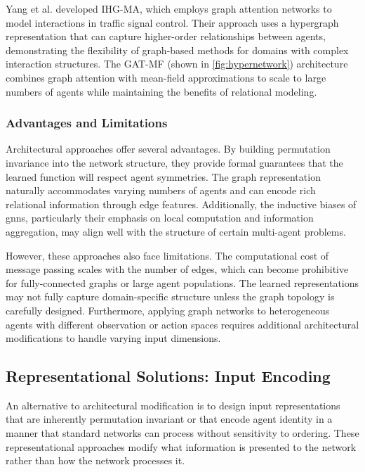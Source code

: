 Yang et al. \cite{yang2021a} developed IHG-MA, which employs
graph attention networks to model interactions in traffic signal
control. Their approach uses a hypergraph representation that
can capture higher-order relationships between agents,
demonstrating the flexibility of graph-based methods for
domains with complex interaction structures. The GAT-MF (shown in \cref{fig:hypernetwork})
architecture \cite{hao2023} combines graph attention with
mean-field approximations to scale to large numbers of agents
while maintaining the benefits of relational modeling.

\subsubsection{Advantages and Limitations}

Architectural approaches offer several advantages. By building
permutation invariance into the network structure, they provide
formal guarantees that the learned function will respect agent
symmetries. The graph representation naturally accommodates
varying numbers of agents and can encode rich relational
information through edge features. Additionally, the inductive
biases of \glspl{gnn}, particularly their emphasis on local
computation and information aggregation, may align well with
the structure of certain multi-agent problems.

However, these approaches also face limitations. The
computational cost of message passing scales with the number
of edges, which can become prohibitive for fully-connected
graphs or large agent populations. The learned representations
may not fully capture domain-specific structure unless the
graph topology is carefully designed. Furthermore, applying
graph networks to heterogeneous agents with different
observation or action spaces requires additional architectural
modifications to handle varying input dimensions.

\subsection{Representational Solutions: Input Encoding}
\label{sec:input-encoding}

An alternative to architectural modification is to design input
representations that are inherently permutation invariant or that
encode agent identity in a manner that standard networks can process
without sensitivity to ordering. These representational approaches
modify what information is presented to the network rather than
how the network processes it.

